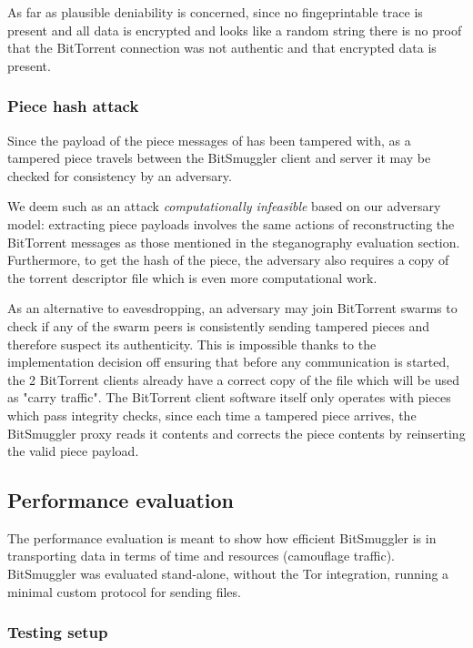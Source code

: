 \documentclass[11pt]{article} %
\newcommand{\projectName}{BitSmuggler }
\begin{document}
As far as plausible deniability is concerned, since no fingeprintable trace is present and all data is encrypted and looks like a random string there is no proof that the BitTorrent connection was not authentic and that encrypted data is present.

\subsubsection{Piece hash attack}

Since the payload of the piece messages of has been tampered with, as a tampered piece travels between the \projectName client and server it may be checked for consistency by an adversary.

We deem such as an attack \textit{computationally infeasible} based on our adversary model: extracting piece payloads involves the same actions of reconstructing the BitTorrent messages as those mentioned in the steganography evaluation section. Furthermore, to get the hash of the piece, the adversary also requires a copy of the torrent descriptor file which is even more computational work.

As an alternative to eavesdropping, an adversary may join BitTorrent swarms to check if any of the swarm peers is consistently sending tampered pieces and therefore suspect its authenticity. This is impossible thanks to the implementation decision off ensuring that before any communication is started, the 2 BitTorrent clients already have a correct copy of the file which will be used as "carry traffic". The BitTorrent client software itself only operates with pieces which pass integrity checks, since each time a tampered piece arrives, the \projectName proxy reads it contents and corrects the piece contents by reinserting the valid piece payload. 

\subsection{Performance evaluation}

The performance evaluation is meant to show how efficient \projectName is in transporting data in terms of time and resources (camouflage traffic). \projectName was evaluated stand-alone, without the Tor integration, running a minimal custom protocol for sending files.

\subsubsection{Testing setup}
\end{document}
